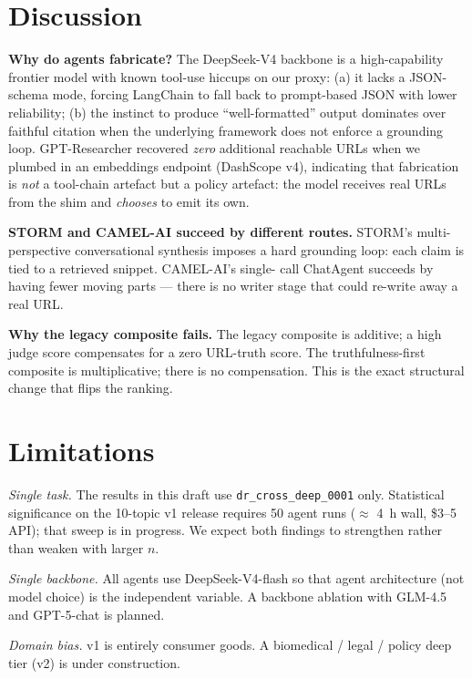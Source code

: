 \documentclass[11pt]{article}
\begin{document}
\section{Discussion}

\textbf{Why do agents fabricate?} The DeepSeek-V4 backbone is a
high-capability frontier model with known tool-use hiccups on our proxy:
(a) it lacks a JSON-schema mode, forcing LangChain to fall back to
prompt-based JSON with lower reliability; (b) the instinct to produce
``well-formatted'' output dominates over faithful citation when the
underlying framework does not enforce a grounding loop. GPT-Researcher
recovered \emph{zero} additional reachable URLs when we plumbed in an
embeddings endpoint (DashScope v4), indicating that fabrication is
\emph{not} a tool-chain artefact but a policy artefact: the model
receives real URLs from the shim and \emph{chooses} to emit its own.

\textbf{STORM and CAMEL-AI succeed by different routes.} STORM's
multi-perspective conversational synthesis imposes a hard grounding
loop: each claim is tied to a retrieved snippet. CAMEL-AI's single-
call ChatAgent succeeds by having fewer moving parts --- there is no
writer stage that could re-write away a real URL.

\textbf{Why the legacy composite fails.} The legacy composite is
additive; a high judge score compensates for a zero URL-truth score.
The truthfulness-first composite is multiplicative; there is no
compensation. This is the exact structural change that flips the
ranking.

\section{Limitations}
\label{sec:limitations}

\emph{Single task.} The results in this draft use
\texttt{dr\_cross\_deep\_0001} only. Statistical significance on the
10-topic v1 release requires 50 agent runs ($\approx$ 4~h wall,
\$3--5 API); that sweep is in progress. We expect both findings to
strengthen rather than weaken with larger $n$.

\emph{Single backbone.} All agents use DeepSeek-V4-flash so that
agent architecture (not model choice) is the independent variable.
A backbone ablation with GLM-4.5 and GPT-5-chat is planned.

\emph{Domain bias.} v1 is entirely consumer goods. A biomedical /
legal / policy deep tier (v2) is under construction.
\end{document}
